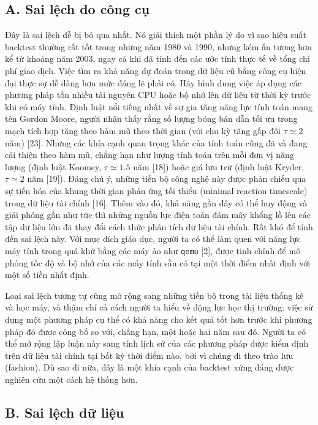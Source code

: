 \subsection*{A. Sai lệch do công cụ}

Đây là sai lệch dễ bị bỏ qua nhất. Nó giải thích một phần lý do vì sao hiệu suất backtest thường rất tốt trong những năm 1980 và 1990, nhưng kém ấn tượng hơn kể từ khoảng năm 2003, ngay cả khi đã tính đến các ước tính thực tế về tổng chi phí giao dịch. Việc tìm ra khả năng dự đoán trong dữ liệu cũ bằng công cụ hiện đại thực sự dễ dàng hơn mức đáng lẽ phải có. Hãy hình dung việc áp dụng các phương pháp tốn nhiều tài nguyên CPU hoặc bộ nhớ lên dữ liệu từ thời kỳ trước khi có máy tính. Định luật nổi tiếng nhất về sự gia tăng năng lực tính toán mang tên Gordon Moore, người nhận thấy rằng số lượng bóng bán dẫn tối ưu trong mạch tích hợp tăng theo hàm mũ theo thời gian (với chu kỳ tăng gấp đôi $\tau \simeq 2$ năm) [23]. Nhưng các khía cạnh quan trọng khác của tính toán cũng đã và đang cải thiện theo hàm mũ, chẳng hạn như lượng tính toán trên mỗi đơn vị năng lượng (định luật Koomey, $\tau \simeq 1.5$ năm [18]) hoặc giá lưu trữ (định luật Kryder, $\tau \simeq 2$ năm [19]). Đáng chú ý, những tiến bộ công nghệ này được phản chiếu qua sự tiến hóa của khung thời gian phản ứng tối thiểu (minimal reaction timescale) trong dữ liệu tài chính [16]. Thêm vào đó, khả năng gần đây có thể huy động và giải phóng gần như tức thì những nguồn lực điện toán đám mây khổng lồ lên các tập dữ liệu lớn đã thay đổi cách thức phân tích dữ liệu tài chính. Rất khó để tính đến sai lệch này. Với mục đích giáo dục, người ta có thể làm quen với năng lực máy tính trong quá khứ bằng các máy ảo như \texttt{qemu} [2], được tinh chỉnh để mô phỏng tốc độ và bộ nhớ của các máy tính sẵn có tại một thời điểm nhất định với một số tiền nhất định.

Loại sai lệch tương tự cũng mở rộng sang những tiến bộ trong tài liệu thống kê và học máy, và thậm chí cả cách người ta hiểu về động lực học thị trường: việc sử dụng một phương pháp cụ thể có khả năng cho kết quả tốt hơn trước khi phương pháp đó được công bố so với, chẳng hạn, một hoặc hai năm sau đó. Người ta có thể mở rộng lập luận này sang tính lịch sử của các phương pháp được kiểm định trên dữ liệu tài chính tại bất kỳ thời điểm nào, bởi vì chúng đi theo trào lưu (fashion). Dù sao đi nữa, đây là một khía cạnh của backtest xứng đáng được nghiên cứu một cách hệ thống hơn.

\subsection*{B. Sai lệch dữ liệu}

